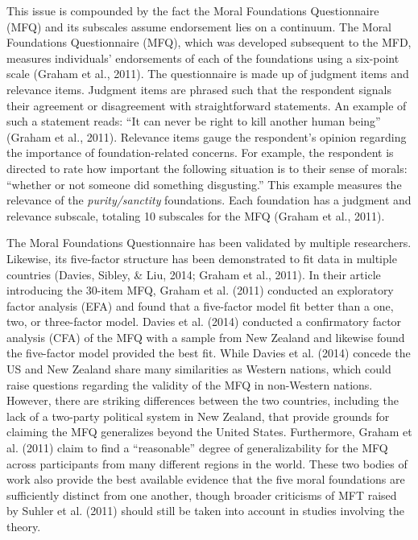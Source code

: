 \documentclass[english,,man]{apa6}
\begin{document}
This issue is compounded by the fact the Moral Foundations Questionnaire (MFQ) and its subscales assume endorsement lies on a continuum. The Moral Foundations Questionnaire (MFQ), which was developed subsequent to the MFD, measures individuals' endorsements of each of the foundations using a six-point scale (Graham et al., 2011). The questionnaire is made up of judgment items and relevance items. Judgment items are phrased such that the respondent signals their agreement or disagreement with straightforward statements. An example of such a statement reads: \enquote{It can never be right to kill another human being} (Graham et al., 2011). Relevance items gauge the respondent's opinion regarding the importance of foundation-related concerns. For example, the respondent is directed to rate how important the following situation is to their sense of morals: \enquote{whether or not someone did something disgusting.} This example measures the relevance of the \emph{purity/sanctity} foundations. Each foundation has a judgment and relevance subscale, totaling 10 subscales for the MFQ (Graham et al., 2011).

The Moral Foundations Questionnaire has been validated by multiple researchers. Likewise, its five-factor structure has been demonstrated to fit data in multiple countries (Davies, Sibley, \& Liu, 2014; Graham et al., 2011). In their article introducing the 30-item MFQ, Graham et al. (2011) conducted an exploratory factor analysis (EFA) and found that a five-factor model fit better than a one, two, or three-factor model. Davies et al. (2014) conducted a confirmatory factor analysis (CFA) of the MFQ with a sample from New Zealand and likewise found the five-factor model provided the best fit. While Davies et al. (2014) concede the US and New Zealand share many similarities as Western nations, which could raise questions regarding the validity of the MFQ in non-Western nations. However, there are striking differences between the two countries, including the lack of a two-party political system in New Zealand, that provide grounds for claiming the MFQ generalizes beyond the United States. Furthermore, Graham et al. (2011) claim to find a \enquote{reasonable} degree of generalizability for the MFQ across participants from many different regions in the world. These two bodies of work also provide the best available evidence that the five moral foundations are sufficiently distinct from one another, though broader criticisms of MFT raised by Suhler et al. (2011) should still be taken into account in studies involving the theory.
\end{document}
